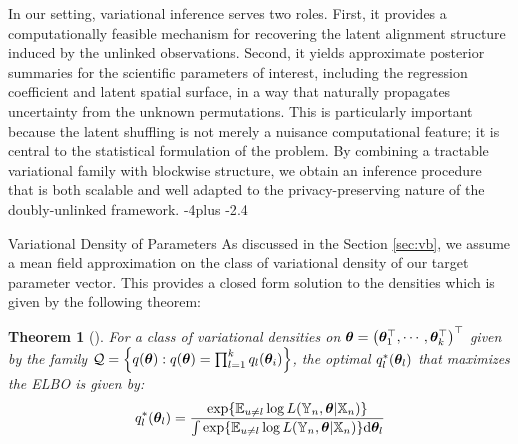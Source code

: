 \documentclass[numsec,webpdf,modern,medium,namedate]{oup-authoring-template}
\makeatletter
\theoremstyle{thmstyleone}%
\newtheorem{theorem}{Theorem}%
\theoremstyle{thmstyletwo}%
\theoremstyle{thmstylethree}%
\def\subsection{%
  \@startsection{subsection}{2}{\z@}
  {-4\p@ plus -2\p@}{\if@traditional.4\p@\else2\p@\fi}
  {\reset@font\raggedright\subsecsize}}
\makeatother
\begin{document}
In our setting, variational inference serves two roles. First, it provides a computationally feasible mechanism for recovering the latent alignment structure induced by the unlinked observations. Second, it yields approximate posterior summaries for the scientific parameters of interest, including the regression coefficient and latent spatial surface, in a way that naturally propagates uncertainty from the unknown permutations. This is particularly important because the latent shuffling is not merely a nuisance computational feature; it is central to the statistical formulation of the problem. By combining a tractable variational family with blockwise structure, we obtain an inference procedure that is both scalable and well adapted to the privacy-preserving nature of the doubly-unlinked framework.
\subsection{Variational Density of Parameters}\label{appendix-vd-parameters}
As discussed in the Section \ref{sec:vb}, we assume a mean field approximation on the class of variational density of our target parameter vector. This provides a closed form solution to the densities which is given by the following theorem:
\begin{theorem}[\cite{ren2011variational}]\label{thm:optimal-vd}
     For a class of variational densities on $\boldsymbol{\theta} = \left(\boldsymbol{\theta}_1^\top,\cdots,\boldsymbol{\theta}_k^\top\right)^\top$ given by the family $\mathcal{Q} = \left\{q(\boldsymbol{\theta}):q(\boldsymbol{\theta}) = \prod_{l=1}^kq_l(\boldsymbol{\theta}_i)\right\}$, the optimal $q^\ast_l(\boldsymbol{\theta}_l)$ that maximizes the ELBO is given by:
    $$
    q^\ast_l(\boldsymbol{\theta}_l) = \dfrac{\exp\{\mathbb{E}_{u \neq l}\log L(\mathbb{Y}_n,\boldsymbol{\theta}|\mathbb{X}_n)\}}{\int \exp\{\mathbb{E}_{u \neq l}\log L(\mathbb{Y}_n,\boldsymbol{\theta}|\mathbb{X}_n)\}\mathrm{d}\boldsymbol{\theta}_l}
    $$
\end{theorem}
\end{document}
